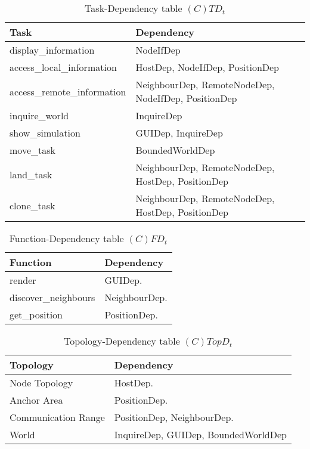 \begin{table}[H]
	\centering
	\begin{tabular}{|p{5cm}|p{7cm}|}
			\hline
			\textbf{Task} & \textbf{Dependency} \\
			\hline
			display\_information & NodeIfDep \\
			\hline
			access\_local\_information & HostDep, NodeIfDep, PositionDep\\
			\hline
			access\_remote\_information & NeighbourDep, RemoteNodeDep, NodeIfDep, PositionDep\\
			\hline
			inquire\_world & InquireDep \\
			\hline
			show\_simulation & GUIDep, InquireDep \\
			\hline
			move\_task & BoundedWorldDep  \\
			\hline
			land\_task & NeighbourDep, RemoteNodeDep, HostDep, PositionDep \\
			\hline
			clone\_task & NeighbourDep, RemoteNodeDep, HostDep, PositionDep \\
			\hline
		\end{tabular}
	\caption{Task-Dependency table $(C)TD_t$}
	\label{tab:ctdt}
\end{table}

\begin{table}[H]
	\centering
	\begin{tabular}{|p{5cm}|p{7cm}|}
			\hline
			\textbf{Function} & \textbf{Dependency} \\
			\hline
			render & GUIDep. \\
			\hline
			discover\_neighbours & NeighbourDep. \\
			\hline
			get\_position & PositionDep. \\
			\hline
		\end{tabular}
	\caption{Function-Dependency table $(C)FD_t$}
	\label{tab:cfdt}
\end{table}

\begin{table}[H]
	\centering
	\begin{tabular}{|p{4cm}|p{8cm}|}
			\hline
			\textbf{Topology} & \textbf{Dependency} \\
			\hline
			Node Topology & HostDep. \\
			\hline
			Anchor Area & PositionDep.\\
			\hline
			Communication Range & PositionDep, NeighbourDep. \\
			\hline
			World & InquireDep, GUIDep, BoundedWorldDep \\
			\hline
		\end{tabular}
	\caption{Topology-Dependency table $(C)TopD_t$}
	\label{tab:ctopdt}
\end{table}

